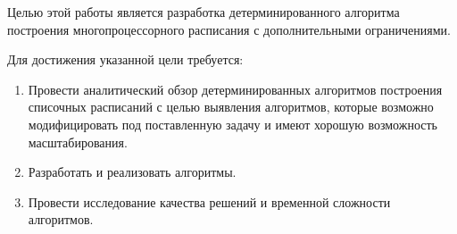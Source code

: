 Целью этой работы является разработка детерминированного алгоритма построения многопроцессорного расписания с дополнительными ограничениями.

Для достижения указанной цели требуется:
\begin{enumerate}
    \item Провести аналитический обзор детерминированных алгоритмов построения списочных расписаний с целью выявления алгоритмов, которые возможно модифицировать под поставленную задачу и имеют хорошую возможность масштабирования.
    \item Разработать и реализовать алгоритмы.
    \item Провести исследование качества решений и временной сложности алгоритмов.
\end{enumerate}